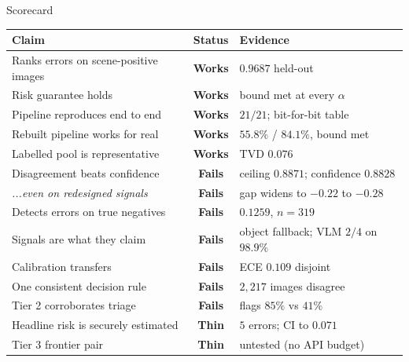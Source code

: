\documentclass[aspectratio=169,11pt]{beamer}
\newcommand{\works}{\textcolor{PrismGreen}{\textbf{Works}}}
\newcommand{\fails}{\textcolor{PrismOrange}{\textbf{Fails}}}
\newcommand{\thin}{\textcolor{HildesheimRed}{\textbf{Thin}}}
\begin{document}
\begin{frame}{Scorecard}
\centering
\footnotesize
\begin{tabular}{@{}p{6.4cm} c p{5.2cm}@{}}
\toprule
\textbf{Claim} & \textbf{Status} & \textbf{Evidence} \\
\midrule
Ranks errors on scene-positive images & \works & $0.9687$ held-out \\
Risk guarantee holds & \works & bound met at every $\alpha$ \\
Pipeline reproduces end to end & \works & $21/21$; bit-for-bit table \\
Rebuilt pipeline works for real & \works & $55.8\%$ / $84.1\%$, bound met \\
Labelled pool is representative & \works & TVD $0.076$ \\
\midrule
Disagreement beats confidence & \fails & ceiling $0.8871$; confidence $0.8828$ \\
\quad \emph{...even on redesigned signals} & \fails & gap widens to $-0.22$ to $-0.28$ \\
Detects errors on true negatives & \fails & $0.1259$, $n=319$ \\
Signals are what they claim & \fails & object fallback; VLM $2/4$ on $98.9\%$ \\
Calibration transfers & \fails & ECE $0.109$ disjoint \\
One consistent decision rule & \fails & $2{,}217$ images disagree \\
Tier 2 corroborates triage & \fails & flags $85\%$ vs $41\%$ \\
\midrule
Headline risk is securely estimated & \thin & $5$ errors; CI to $0.071$ \\
Tier 3 frontier pair & \thin & untested (no API budget) \\
\bottomrule
\end{tabular}
\end{frame}
\end{document}
